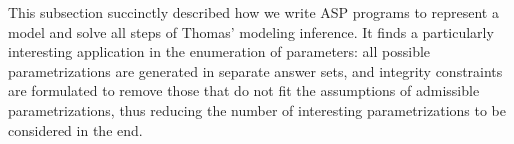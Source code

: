 This subsection succinctly described how we write ASP programs to represent a model and solve all steps of Thomas' modeling inference.
It finds a particularly interesting application in the enumeration of parameters: all possible parametrizations are generated in separate answer sets, and integrity constraints are formulated to remove those that do not fit the assumptions of admissible parametrizations,
thus reducing the number of interesting parametrizations to be considered in the end.
